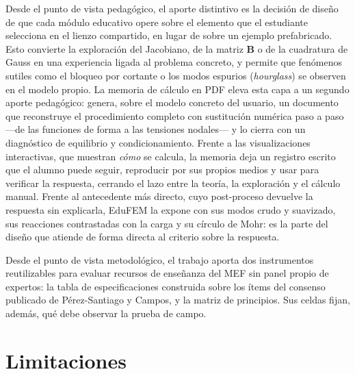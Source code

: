 Desde el punto de vista pedagógico, el aporte distintivo es la decisión de diseño de que cada módulo educativo opere sobre el elemento que el estudiante selecciona en el lienzo compartido, en lugar de sobre un ejemplo prefabricado. Esto convierte la exploración del Jacobiano, de la matriz $\bm{B}$ o de la cuadratura de Gauss en una experiencia ligada al problema concreto, y permite que fenómenos sutiles como el bloqueo por cortante o los modos espurios (\emph{hourglass}) se observen en el modelo propio. La memoria de cálculo en PDF eleva esta capa a un segundo aporte pedagógico: genera, sobre el modelo concreto del usuario, un documento que reconstruye el procedimiento completo con sustitución numérica paso a paso —de las funciones de forma a las tensiones nodales— y lo cierra con un diagnóstico de equilibrio y condicionamiento. Frente a las visualizaciones interactivas, que muestran \emph{cómo} se calcula, la memoria deja un registro escrito que el alumno puede seguir, reproducir por sus propios medios y usar para verificar la respuesta, cerrando el lazo entre la teoría, la exploración y el cálculo manual. Frente al antecedente más directo, cuyo post-proceso devuelve la respuesta sin explicarla, EduFEM la expone con sus modos crudo y suavizado, sus reacciones contrastadas con la carga y su círculo de Mohr: es la parte del diseño que atiende de forma directa al criterio sobre la respuesta.

Desde el punto de vista metodológico, el trabajo aporta dos instrumentos reutilizables para evaluar recursos de enseñanza del MEF sin panel propio de expertos: la tabla de especificaciones construida sobre los ítems del consenso publicado de Pérez-Santiago y Campos, y la matriz de principios. Sus celdas fijan, además, qué debe observar la prueba de campo.

\section*{Limitaciones}

